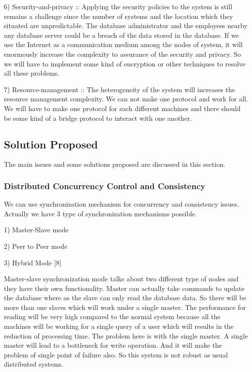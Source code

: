 \documentclass{article}[12pt,a4paper]
\begin{document}
6) Security-and-privacy :: Applying the security policies to the system is still remains a challenge since the number of systems and the location which they situated are unpredictable. The database administrator and the employees nearby any database server could be a breach of the data stored in the database. If we use the Internet as a communication medium among the nodes of system, it will enormously increase the complexity to assurance of the security and privacy. So we will have to implement some kind of encryption or other techniques to resolve all these problems.

7) Resource-management :: The heterogeneity of the system will increases the resource management complexity. We can not make one protocol and work for all. We will have to make one protocol for each different machines and there should be some kind of a bridge protocol to interact with one another.



\subsection {Solution Proposed}


The main issues and some solutions proposed are discussed in this section.

\subsubsection {Distributed Concurrency Control and Consistency}

We can use synchronization mechanism for concurrency and consistency issues. Actually we have 3 type of synchronization mechanisms possible.

1) Master-Slave mode

2) Peer to Peer mode

3) Hybrid Mode [8]

Master-slave synchronization mode talks about two different type of nodes and they have their own functionality. Master can actually take commands to update the database where as the slave can only read the database data. So there will be more than one slaves which will work under a single master. The performance for reading will be very high compared to the normal system because all the machines will be working for a single query of a user which will results in the reduction of processing time. The problem here is with the single master. A single master will lead to a bottleneck for write operation. And it will make the problem of single point of failure also. So this system is not robust as usual distributed systems.
\end{document}
